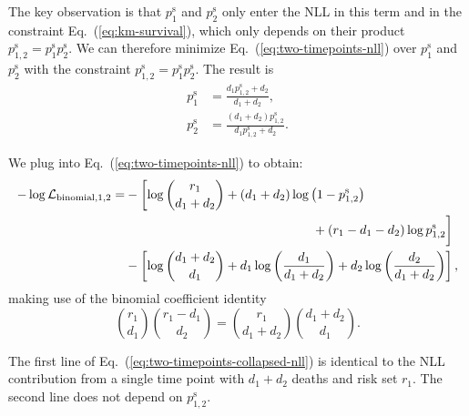 \documentclass[pdflatex,sn-basic]{sn-jnl}%
\theoremstyle{thmstyleone}%
\theoremstyle{thmstyletwo}%
\theoremstyle{thmstylethree}%
\begin{document}
\begin{appendices}
The key observation is that \(p_1^\text{s}\) and \(p_2^\text{s}\) only enter the NLL in this term and in the constraint Eq.~(\ref{eq:km-survival}), which only depends on their product \(p_{1,2}^\text{s}=p_1^\text{s} p_2^\text{s}\)\@. We can therefore minimize Eq.~(\ref{eq:two-timepoints-nll}) over \(p_1^\text{s}\) and \(p_2^\text{s}\) with the constraint \(p_{1,2}^\text{s}=p_1^\text{s} p_2^\text{s}\)\@.  The result is
\begin{align}
p_1^\text{s} &= \frac{d_1 p_{1,2}^\text{s}+d_2}{d_1+d_2}, \\
p_2^\text{s} &= \frac{(d_1+d_2) p_{1,2}^\text{s}}{d_1 p_{1,2}^\text{s} + d_2}.
\end{align}

We plug into Eq.~(\ref{eq:two-timepoints-nll}) to obtain:
{
\newcommand{\firstline}{\log\binom{r_1}{d_1+d_2} + (d_1+d_2) \log\left(1-p_{1,2}^\text{s}\right)}
\newcommand{\secondline}{+ (r_1-d_1-d_2) \log{}p_{1,2}^\text{s}}
\begin{align}
\begin{aligned}
-\log \mathcal{L}_{\text{binomial},1,2} =&-\left[\firstline\vphantom{\secondline}\right. \\
&\qquad\qquad\qquad\qquad\qquad\qquad\qquad\hspace{0.013\textwidth}\left.\vphantom{\firstline}\secondline\right] \\
&-\left[\log\binom{d_1+d_2}{d_1} + d_1 \log \left(\frac{d_1}{d_1+d_2}\right) + d_2 \log \left(\frac{d_2}{d_1+d_2}\right)\right],
\end{aligned}
\label{eq:two-timepoints-collapsed-nll}
\end{align}
}
making use of the binomial coefficient identity
\begin{equation}
\binom{r_1}{d_1}\binom{r_1-d_1}{d_2} = \binom{r_1}{d_1+d_2}\binom{d_1+d_2}{d_1}.
\end{equation}

The first line of Eq.~(\ref{eq:two-timepoints-collapsed-nll}) is identical to the NLL contribution from a single time point with \(d_1+d_2\) deaths and risk set \(r_1\)\@. The second line does not depend on \(p_{1,2}^\text{s}\).


\end{appendices}
\end{document}

